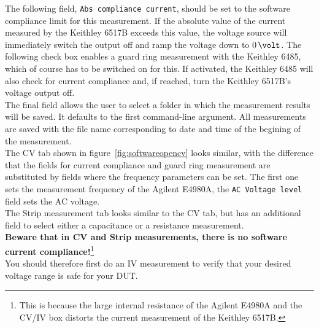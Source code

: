 \documentclass[a4paper]{article}
\begin{document}
The following field, {\tt Abs compliance current}, should be set to the software compliance limit for this measurement.
If the absolute value of the current measured by the Keithley 6517B exceeds this value, the voltage source will immediately switch the output off and ramp the voltage down to $0\,\volt$.
The following check box enables a guard ring measurement with the Keithley 6485, which of course has to be switched on for this.
If activated, the Keithley 6485 will also check for current compliance and, if reached, turn the Keithley 6517B's voltage output off.\\

The final field allows the user to select a folder in which the measurement results will be saved.
It defaults to the first command-line argument.
All measurements are saved with the file name corresponding to date and time of the begining of the measurement.\\

The CV tab shown in figure~\ref{fig:softwareopencv} looks similar, with the difference that the fields for current compliance and guard ring measurement are substituted by fields where the frequency parameters can be set.
The first one sets the measurement frequency of the Agilent E4980A, the {\tt AC Voltage level} field sets the AC voltage.\\

The Strip measurement tab looks similar to the CV tab, but has an additional field to select either a capacitance or a resistance measurement.\\

{\bf Beware that in CV and Strip measurements, there is no software current compliance!}\footnote{This is because the large internal resistance of the Agilent E4980A and the CV/IV box distorts the current measurement of the Keithley 6517B.}\\

You should therefore first do an IV measurement to verify that your desired voltage range is safe for your DUT.\\
\end{document}
